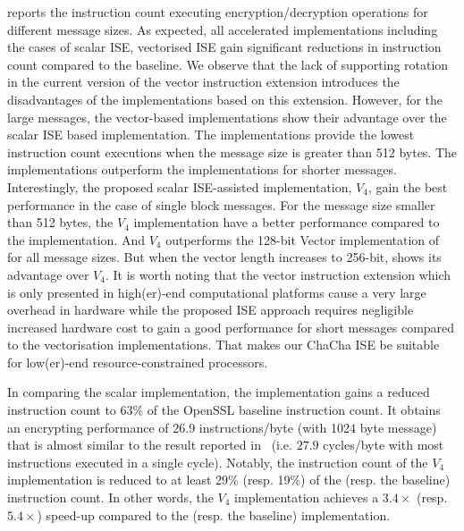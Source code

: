  reports the instruction count executing encryption/decryption operations for different message sizes. 
As expected, all accelerated implementations including the cases of scalar ISE, vectorised ISE gain significant reductions in instruction count compared to the baseline. 
We observe that the lack of supporting rotation in the current version of the vector instruction extension introduces the disadvantages of the implementations based on this extension. 
However, for the large messages, the vector-based implementations show their advantage over the scalar ISE based implementation. 
The  implementations provide the lowest instruction count executions when the message size is greater than 512 bytes. 
The  implementations outperform the  implementations for shorter messages.
Interestingly, the proposed scalar ISE-assisted implementation, $V_4$, gain the best performance in the case of single block messages.
For the message size smaller than 512 bytes, the $V_4$ implementation have a better performance compared to the  implementation. 
And $V_4$ outperforms the 128-bit Vector implementation of  for all message sizes. But when the vector length increases to 256-bit,  shows its advantage over $V_4$. It is worth noting that the vector instruction extension which is only presented in high(er)-end computational platforms cause a very large overhead in hardware while the proposed ISE approach requires negligible increased hardware cost to gain a good performance for short messages compared to the vectorisation implementations. That makes our ChaCha ISE be suitable for low(er)-end resource-constrained processors.

In comparing the scalar implementation, the  implementation gains a reduced instruction count to 63\% of the OpenSSL baseline instruction count.
It obtains an encrypting performance of $26.9$ instructions/byte (with 1024 byte message) that is almost similar to the result reported in~\cite{Sto:19} (i.e. $27.9$ cycles/byte with most instructions executed in a single cycle). 
Notably, the instruction count of the $V_4$ implementation is reduced to at least 29\% (resp. 19\%) of the  (resp. the baseline) instruction count. In other words, the $V_4$ implementation achieves a $3.4\times$ (resp. $5.4\times$) speed-up compared to the  (resp. the baseline) implementation. 


